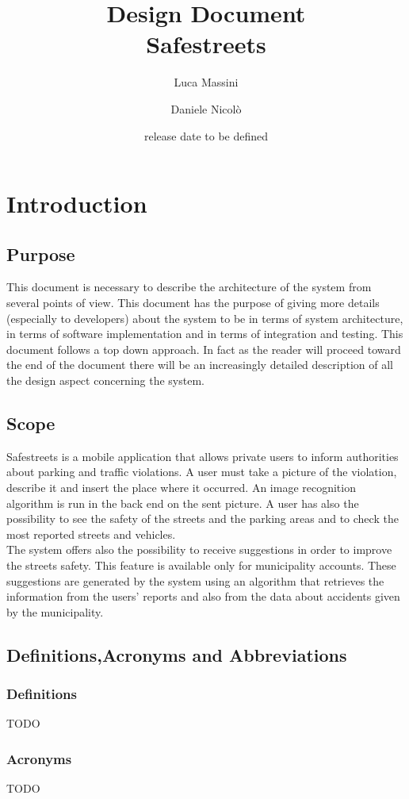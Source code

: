 \documentclass[titlepage]{article}
\author{Luca Massini \and Daniele Nicolò}
\title{Design Document
\\  Safestreets}
\date{release date to be defined}
\begin{document}
\maketitle
\newpage 
\tableofcontents
\newpage
\section{Introduction}
\subsection{Purpose}
	This document is necessary to describe the architecture of the system from several points of view. This document has the purpose of giving more details (especially to developers) about the system to be in terms of system architecture, in terms of software implementation and in terms of integration and testing. This document follows a top down approach. In fact as the reader will proceed toward the end of the document there will be an increasingly detailed description of all the design aspect concerning the system.
\subsection{Scope}
Safestreets is a mobile application that allows private users to inform authorities about parking and traffic violations. A user must take a picture of the violation, describe it and  insert the place where it occurred. An image recognition algorithm is run in the  back end on the sent picture. A user has also the possibility to see the safety of the streets and the parking areas and to check the most reported streets and vehicles. \\
The system offers also the possibility to receive suggestions in order to improve the streets safety. This feature is available only for municipality accounts. These  suggestions are generated by the system using an algorithm that retrieves the information from the users' reports and also from the data about accidents given by the municipality.
\subsection{Definitions,Acronyms and Abbreviations}
\subsubsection{Definitions}
TODO
\subsubsection{Acronyms}
TODO
\end{document}

